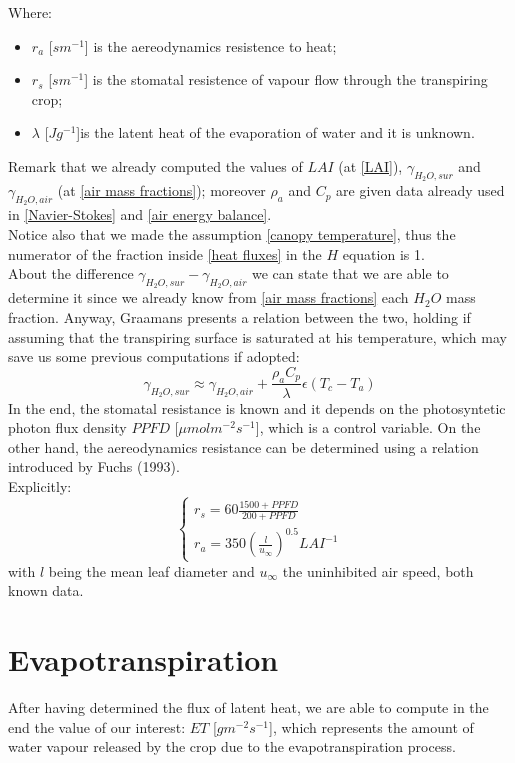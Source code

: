 Where:
\begin{itemize}
	\item $r_a$ [$sm^{-1}$] is the aereodynamics resistence to heat;
	\item $r_s$ [$sm^{-1}$] is the stomatal resistence of vapour flow through the transpiring crop;
	\item $\lambda$ [$Jg^{-1}$]is the latent heat of the evaporation of water and it is unknown.
\end{itemize}
Remark that we already computed the values of $LAI$ (at \eqref{LAI}), $\gamma_{H_2O,sur}$ and $\gamma_{H_2O,air}$ (at \eqref{air mass fractions}); moreover $\rho_a$ and $C_p$ are given data already used in \eqref{Navier-Stokes} and \eqref{air energy balance}.\\
Notice also that we made the assumption \eqref{canopy temperature}, thus the numerator of the fraction inside \eqref{heat fluxes} in the $H$ equation is 1.\\
About the difference $\gamma_{H_2O,sur} - \gamma_{H_2O,air}$ we can state that we are able to determine it since we already know from \eqref{air mass fractions} each $H_2O$ mass fraction. Anyway, Graamans presents a relation between the two, holding if assuming that the transpiring surface is saturated at his temperature, which may save us some previous computations if adopted:
\begin{equation}	\label{saturation hypotesis}
	 \gamma_{H_2O,sur} \approx{ \gamma_{H_2O,air} + \frac{\rho_a C_p}{\lambda} \epsilon (T_c-T_a) }
\end{equation}
In the end, the stomatal resistance is known and it depends on the photosyntetic photon flux density $PPFD$ [$\mu mol m^{-2}s^{-1}$], which is a control variable.
On the other hand, the aereodynamics resistance can be determined using a relation introduced by Fuchs (1993).\\
Explicitly:
\begin{equation}	\label{graamans resistences}
	\begin{cases}
		r_s = 60 \frac{1500 + PPFD}{200 + PPFD}\\
		r_a = 350 (\frac{l}{u_\infty})^{0.5} LAI^{-1}
	\end{cases}
\end{equation}
with $l$ being the mean leaf diameter and $u_\infty$ the uninhibited air speed, both known data.
	
\section{Evapotranspiration}
After having determined the flux of latent heat, we are able to compute in the end the value of our interest: $ET$ [$gm^{-2}s^{-1}$], which represents the amount of water vapour released by the crop due to the evapotranspiration process.